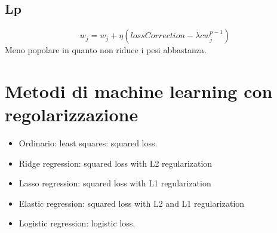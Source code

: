 	\subsection{Lp}
	$$w_j = w_j + \eta(lossCorrection - \lambda cw_j^{p-1})$$
	Meno popolare in quanto non riduce i pesi abbastanza.

	\section{Metodi di machine learning con regolarizzazione}
	\begin{multicols}{2}
		\begin{itemize}
			\item Ordinario: least squares: squared loss.
			\item Ridge regression: squared loss with L2 regularization
			\item Lasso regression: squared loss with L1 regularization
			\item Elastic regression: squared loss with L2 and L1 regularization
			\item Logistic regression: logistic loss.
		\end{itemize}
	\end{multicols}
